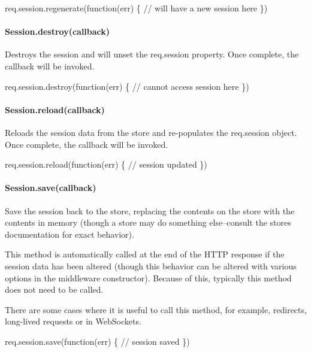 \begin{DoxyCode}
req.session.regenerate(function(err) \{
  // will have a new session here
\})
\end{DoxyCode}


\paragraph*{Session.\+destroy(callback)}

Destroys the session and will unset the {\ttfamily req.\+session} property. Once complete, the {\ttfamily callback} will be invoked.


\begin{DoxyCode}
req.session.destroy(function(err) \{
  // cannot access session here
\})
\end{DoxyCode}


\paragraph*{Session.\+reload(callback)}

Reloads the session data from the store and re-\/populates the {\ttfamily req.\+session} object. Once complete, the {\ttfamily callback} will be invoked.


\begin{DoxyCode}
req.session.reload(function(err) \{
  // session updated
\})
\end{DoxyCode}


\paragraph*{Session.\+save(callback)}

Save the session back to the store, replacing the contents on the store with the contents in memory (though a store may do something else--consult the store\textquotesingle{}s documentation for exact behavior).

This method is automatically called at the end of the H\+T\+TP response if the session data has been altered (though this behavior can be altered with various options in the middleware constructor). Because of this, typically this method does not need to be called.

There are some cases where it is useful to call this method, for example, redirects, long-\/lived requests or in Web\+Sockets.


\begin{DoxyCode}
req.session.save(function(err) \{
  // session saved
\})
\end{DoxyCode}



